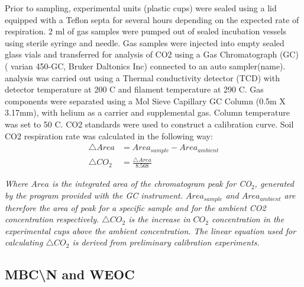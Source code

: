 \documentclass[12pt]{report}
\begin{document}
Prior to sampling, experimental units (plastic cups) were sealed using a lid equipped with a Teflon septa for several hours depending on the expected rate of respiration. 2 ml of gas samples were pumped out of sealed incubation vessels using sterile syringe and needle. Gas samples were injected into empty sealed glass vials and transferred for analysis of CO2 using a Gas Chromatograph (GC) ( varian 450-GC, Bruker Daltonics Inc) connected to an auto sampler(name). analysis was carried out using a Thermal conductivity detector (TCD) with detector temperature at 200 C and filament temperature at 290 C. Gas components were separated using a Mol Sieve Capillary GC Column (0.5m X 3.17mm), with helium as a carrier and supplemental gas. Column temperature was set to 50 C. CO2   standards were used to construct a calibration curve.
Soil CO2 respiration rate was calculated in the following way:\\

\begin{align} %
\triangle Area &= Area_{sample} - Area_{ambient}\\
\triangle CO_2 &= \frac{\triangle Area}{8.568}
\end{align}

\begin{adjustwidth}{50pt}{50pt}
	\begin{footnotesize}
		\textit{Where $Area$ is the integrated area of the chromatogram peak for CO$_2$, generated by the program provided with the GC instrument. $ Area_{sample} $ and $  Area_{ambient} $ are therefore the area of peak for a specific sample and for the ambient CO2 concentration respectively.  $\triangle CO_2$  is the increase in $ CO_2 $ concentration in the experimental cups above the ambient concentration. The linear equation used for calculating  $\triangle CO_2$ is derived from preliminary calibration experiments.}
	\end{footnotesize}
\end{adjustwidth}    	

\subsection{MBC\textbackslash{}N and WEOC}
\end{document}
